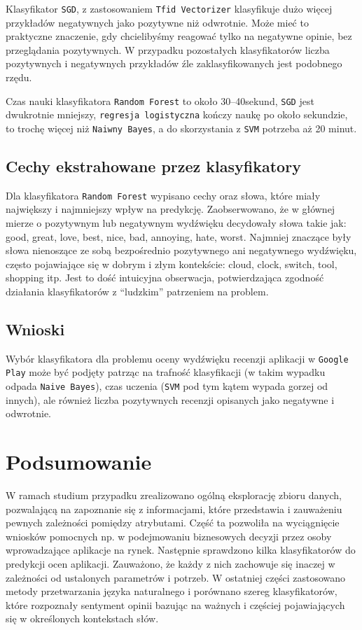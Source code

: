 \documentclass{article}
\begin{document}
Klasyfikator \texttt{SGD}, z zastosowaniem \texttt{Tfid Vectorizer} klasyfikuje dużo więcej przykładów negatywnych jako pozytywne niż odwrotnie. Może mieć to praktyczne znaczenie, gdy chcielibyśmy reagować tylko na negatywne opinie, bez przeglądania pozytywnych. W przypadku pozostałych klasyfikatorów liczba pozytywnych i negatywnych przykładów źle zaklasyfikowanych jest podobnego rzędu.

Czas nauki klasyfikatora \texttt{Random Forest} to około 30--40sekund, \texttt{SGD} jest dwukrotnie mniejszy, \texttt{regresja logistyczna} kończy naukę po około sekundzie, to trochę więcej niż \texttt{Naiwny Bayes}, a do skorzystania z \texttt{SVM} potrzeba aż 20 minut.

\subsection{Cechy ekstrahowane przez klasyfikatory}
Dla klasyfikatora \texttt{Random Forest} wypisano cechy oraz słowa, które miały największy i najmniejszy wpływ na predykcję. Zaobserwowano, że w głównej mierze o pozytywnym lub negatywnym wydźwięku decydowały słowa takie jak: good, great, love, best, nice, bad, annoying, hate, worst. Najmniej znaczące były słowa nienoszące ze sobą bezpośrednio pozytywnego ani negatywnego wydźwięku, często pojawiające się w dobrym i złym kontekście: cloud, clock, switch, tool, shopping itp. Jest to dość intuicyjna obserwacja, potwierdzająca zgodność działania klasyfikatorów z ``ludzkim'' patrzeniem na problem.

\subsection{Wnioski}
Wybór klasyfikatora dla problemu oceny wydźwięku recenzji aplikacji w \texttt{Google Play} może być podjęty patrząc na trafność klasyfikacji (w takim wypadku odpada \texttt{Naive Bayes}), czas uczenia (\texttt{SVM} pod tym kątem wypada gorzej od innych), ale również liczba pozytywnych recenzji opisanych jako negatywne i odwrotnie.

\section{Podsumowanie}
W ramach studium przypadku zrealizowano ogólną eksplorację zbioru danych, pozwalającą na zapoznanie się z informacjami, które przedstawia i zauważeniu pewnych zależności pomiędzy atrybutami. Część ta pozwoliła na wyciągnięcie wniosków pomocnych np. w podejmowaniu biznesowych decyzji przez osoby wprowadzające aplikacje na rynek. Następnie sprawdzono kilka klasyfikatorów do predykcji ocen aplikacji. Zauważono, że każdy z nich zachowuje się inaczej w zależności od ustalonych parametrów i potrzeb. W ostatniej części zastosowano metody przetwarzania języka naturalnego i porównano szereg klasyfikatorów, które rozpoznały sentyment opinii bazując na ważnych i częściej pojawiających się w określonych kontekstach słów.
\end{document}
